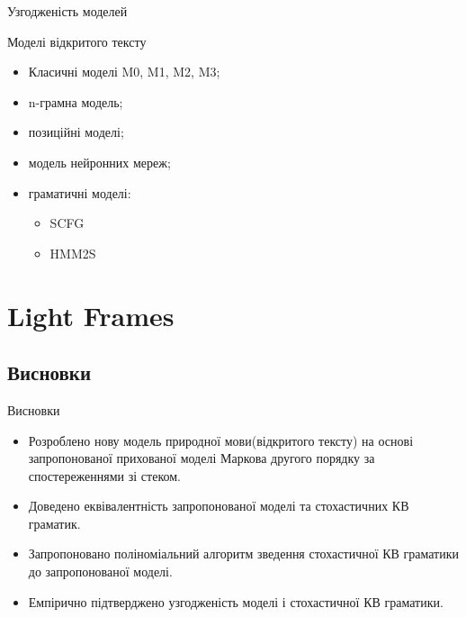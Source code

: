\documentclass{beamer}
\begin{document}
\begin{darkframes}
\begin{frame}{Узгодженість моделей}
\begin{table}[!b]
      \end{table}

    \end{frame}
    \begin{frame}{Моделі відкритого тексту}
      \begin{itemize}
        \item Класичні моделі M0, M1, M2, M3;
        \item n-грамна модель;
        \item позиційні моделі;
        \item модель нейронних мереж;
        \item граматичні моделі:
          \begin{itemize}
            \item SCFG
            \item \alert{HMM2S}
          \end{itemize}
      \end{itemize}
    \end{frame}
  \end{darkframes}


  \section{Light Frames}
    \subsection{Висновки}
    \begin{frame}{Висновки}
      \begin{itemize}
        \item Розроблено нову модель природної мови(відкритого тексту) на основі запропонованої прихованої моделі Маркова другого порядку за спостереженнями зі стеком.
        \item Доведено еквівалентність запропонованої моделі та стохастичних КВ граматик.
        \item Запропоновано поліноміальний алгоритм зведення стохастичної КВ граматики до запропонованої моделі.
        \item Емпірично підтверджено узгодженість моделі і стохастичної КВ граматики.
      \end{itemize}
    \end{frame}
\end{document}
